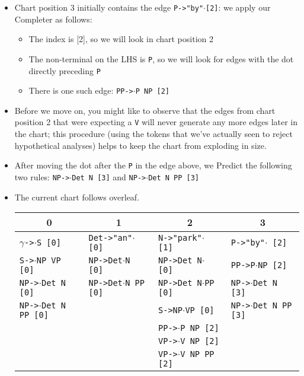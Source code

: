 \documentclass[a4paper]{article}
\begin{document}
\begin{enumerate}
\begin{enumerate}
\begin{enumerate}
\begin{itemize}
\item Chart position 3 initially contains the edge \texttt{P->"by"}$\cdot$\texttt{[2]}: we apply our Completer as follows:
\begin{itemize}
\item The index is [2], so we will look in chart position 2
\item The non-terminal on the LHS is \texttt{P}, so we will look for edges with the dot directly preceding \texttt{P}
\item There is one such edge: \texttt{PP->}$\cdot$\texttt{P NP [2]}
\end{itemize}
\item Before we move on, you might like to observe that the edges from chart position 2 that were expecting a \texttt{V} will never generate any more edges later in the chart; this procedure (using the tokens that we've actually seen to reject hypothetical analyses) helps to keep the chart from exploding in size.
\item After moving the dot after the \texttt{P} in the edge above, we Predict the following two rules: \texttt{NP->}$\cdot$\texttt{Det N [3]} and \texttt{NP->}$\cdot$\texttt{Det N PP [3]}
\item The current chart follows overleaf.
\begin{table}[ht]
\centering
\begin{tabular}{l|l|l|l}
\multicolumn{1}{c}{0} & \multicolumn{1}{c}{1} &\multicolumn{1}{c}{2} & \multicolumn{1}{c}{3} \\
\hline
$\gamma$\texttt{->}$\cdot$\texttt{S [0]} & \texttt{Det->"an"}$\cdot$\texttt{ [0]} & \texttt{N->"park"}$\cdot$\texttt{ [1]} & \texttt{P->"by"}$\cdot$\texttt{ [2]} \\
\texttt{S->}$\cdot$\texttt{NP VP [0]} & \texttt{NP->Det}$\cdot$\texttt{N [0]} & \texttt{NP->Det N}$\cdot$\texttt{ [0]} & \texttt{PP->P}$\cdot$\texttt{NP [2]} \\
\texttt{NP->}$\cdot$\texttt{Det N [0]} & \texttt{NP->Det}$\cdot$\texttt{N PP [0]} & \texttt{NP->Det N}$\cdot$\texttt{PP [0]} & \texttt{NP->}$\cdot$\texttt{Det N [3]} \\
\texttt{NP->}$\cdot$\texttt{Det N PP [0]} & & \texttt{S->NP}$\cdot$\texttt{VP [0]} & \texttt{NP->}$\cdot$\texttt{Det N PP [3]} \\
 & & \texttt{PP->}$\cdot$\texttt{P NP [2]} & \\
 & & \texttt{VP->}$\cdot$\texttt{V NP [2]} & \\
 & & \texttt{VP->}$\cdot$\texttt{V NP PP [2]} & \\

\end{tabular}
\end{table}
\end{itemize}
\end{enumerate}
\end{enumerate}
\end{enumerate}
\end{document}
